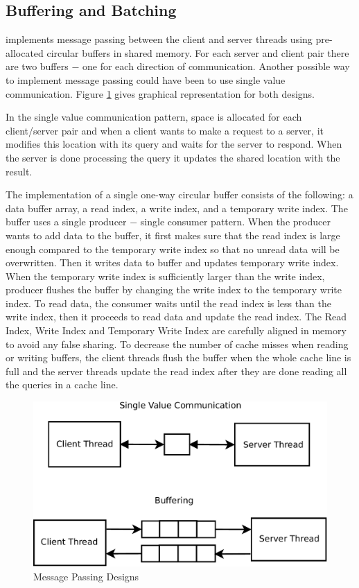 \subsection{Buffering and Batching}
\label{sec:msgpassing}

\cphash{} implements message passing between the client and server threads using pre-allocated circular buffers in shared memory. 
For each server and client pair there are two buffers $-$ one for each direction of communication. Another possible way to 
implement message passing could have been to use single value communication. Figure \ref{fig:mpdesign} gives graphical representation for both designs.

In the single value communication pattern, space is allocated for each client/server pair and when a client wants to make 
a request to a server, it modifies this location with its query and waits for the server to respond. When the server is done processing the query it 
updates the shared location with the result. 

The implementation of a single one-way circular buffer consists of the following: a data buffer array, a read index, 
a write index, and a temporary write index. The buffer uses a single producer $-$ single consumer pattern. When the producer wants to add 
data to the buffer, it first makes sure that the read index is large enough compared to the temporary write index so that no 
unread data will be overwritten. Then it writes data to buffer and updates temporary write index. When the temporary write 
index is sufficiently larger than the write index, producer flushes the buffer by changing the write index to the temporary write index. 
To read data, the consumer waits until the read index is less than the write index, then it proceeds to read data and update the read 
index. The Read Index, Write Index and Temporary Write Index are carefully aligned in memory to avoid any false sharing. 
To decrease the number of cache misses when reading or writing buffers, the client threads flush the buffer when the whole cache line is 
full and the server threads update the read index after they are done reading all the queries in a cache line.

\begin{figure}[!ht]
  \centering
  \includegraphics[width=\linewidth]{figs/mpdesign.pdf}
  \caption{Message Passing Designs}
  \label{fig:mpdesign}
\end{figure}

